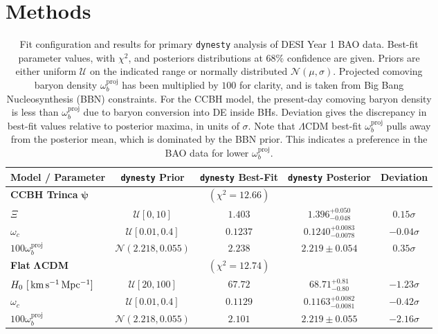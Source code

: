 \documentclass[a4paper,11pt]{article}
\newcommand{\kmsMpc}{\,{\rm km\,s^{-1}\,Mpc^{-1}}}
\begin{document}
\section{Methods}
\label{sec:methods}
\begin{table}
  \centering
  \def\arraystretch{1.2}
  \small
 \begin{tabular}{lcccc}
   \toprule
   \midrule
   Model / Parameter &  \texttt{dynesty} Prior & \texttt{dynesty} Best-Fit & \texttt{dynesty} Posterior & Deviation \\ 
   \midrule
       {\bf CCBH Trinca} $\boldsymbol{\psi}$ && $\left(\chi^2 = 12.66\right)$ & & \\
       $\Xi$ & $\mathcal{U}[0, 10]$ & $1.403$ & $1.396^{+0.050}_{-0.048}$ & $0.15\sigma$ \\
       $\omega_c$ & $\mathcal{U}[0.01, 0.4]$ & $0.1237$ & $0.1240^{+0.0083}_{-0.0078}$ & $-0.04\sigma$ \\
       $100\omega_b^\mathrm{proj}$ & $\mathcal{N}(2.218, 0.055)$ & $2.238$ & $2.219 \pm 0.054$ & $0.35\sigma$\\
       \midrule
           {\bf Flat} $\boldsymbol{\Lambda}${\bf CDM} && $\left(\chi^2 = 12.74\right)$ && \\
           $H_0~[\kmsMpc]$ & $\mathcal{U}[20, 100]$ & $67.72$ & $68.71^{+0.81}_{-0.80}$ & $-1.23\sigma$ \\
           $\omega_c$ & $\mathcal{U}[0.01, 0.4]$ & $0.1129$ & $0.1163^{+0.0082}_{-0.0081}$ & $-0.42\sigma$ \\
           $100\omega_b^\mathrm{proj}$ &$\mathcal{N}(2.218, 0.055)$& $2.101$ & $2.219 \pm 0.055$ & $-2.16\sigma$ \\
           \midrule
   \bottomrule
   \end{tabular}
 \caption{\label{tbl:fit_parameters}
   Fit configuration and results for primary \texttt{dynesty} analysis of DESI Year 1 BAO data.
   Best-fit parameter values, with $\chi^2$, and posteriors distributions at $68\%$ confidence are given.
   Priors are either uniform $\mathcal{U}$ on the indicated range or normally distributed $\mathcal{N}(\mu, \sigma)$.
   Projected comoving baryon density $\omega_b^\mathrm{proj}$ has been multiplied by $100$ for clarity, and is taken from Big Bang Nucleosynthesis (BBN) constraints.
   For the CCBH model, the present-day comoving baryon density is less than $\omega_b^\mathrm{proj}$ due to baryon conversion into DE inside BHs.
   Deviation gives the discrepancy in best-fit values relative to posterior maxima, in units of $\sigma$.
   Note that $\Lambda$CDM best-fit $\omega_b^\mathrm{proj}$ pulls away from the posterior mean, which is dominated by the BBN prior.
   This indicates a preference in the BAO data for lower $\omega_b^\mathrm{proj}$.}
  \vspace{0.1em}
\end{table}%
\end{document}
